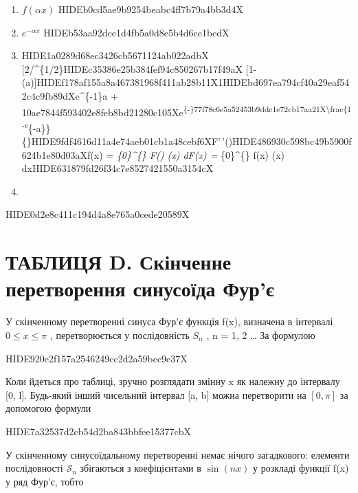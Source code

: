 \documentclass[
  ukrainian,
]{article}
\begin{document}
\begin{enumerate}
\def\labelenumi{\arabic{enumi}.}
\setcounter{enumi}{1}
\item
  \(f(\alpha x)\) HIDEb0cd5ae9b9254beabc4ff7b79a4bb3d4X
\item
  \(e^{-\alpha x}\) HIDEb53aa92dce1d4fb5a0d8c5b4d6ce1bcdX
\item
  HIDE1a0289d68ec3426cb5671124ab022adbX
  {[}2/\pi\omega{]}\^{}\{1/2\}HIDEc35386e25b384fef94c850267b17f49aX
  {[}1-\cos(\omega a){]}HIDEf178af155a8a467381968f411ab28b11X1HIDEbd697ea794cf40a29eaf542c4c9fb89dXe\^{}\{-1\}a
  +
  \omegaHIDE10ae7844f593402e8feb8bd21280c105Xe\textsuperscript{\{-\alpha\}\sin\omegaHIDE77f78c6e5a52453b9ddc1e72cb17aa21X\textbackslash frac\{1-e}\{-a\omega\}\}\{\omega\}HIDE9fdf4616d11a4e74aeb01cb1a48cebf6XF'\,'(\omega)HIDE486930c598bc49b5900f624b1e80d03aXf(x)
  = \int\emph{\{0\}\^{}\{\infty\} F(\omega) \cos(\omega x)
  d\omega \qquad \qquad F(x) =  \int}\{0\}\^{}\{\infty\}
  f(x) \cos(\omega x) dxHIDE631879fd26f34c7e8527421550a3154cX
\item
\end{enumerate}

HIDE0d2e8c411c194d4a8e765a0cede20589X

\section{ТАБЛИЦЯ D. Скінченне перетворення синусоїда
Фур'є}\label{ux442ux430ux431ux43bux438ux446ux44f-d.-ux441ux43aux456ux43dux447ux435ux43dux43dux435-ux43fux435ux440ux435ux442ux432ux43eux440ux435ux43dux43dux44f-ux441ux438ux43dux443ux441ux43eux457ux434ux430-ux444ux443ux440ux454-1}

У скінченному перетворенні синуса Фур'є функція f(x), визначена в
інтервалі \(0 \le x \le \pi\) , перетворюється у послідовність \(S_n\) ,
n = 1, 2 \ldots{} За формулою

HIDE920e2f157a2546249cc2d2a59bcc9e37X

Коли йдеться про таблиці, зручно розглядати змінну x як належну до
інтервалу {[}0, l{]}. Будь-який інший чисельний інтервал {[}a, b{]}
можна перетворити на \([0, \pi]\) за допомогою формули

HIDE7a32537d2cb54d2ba843bbfee15377cbX

У скінченному синусоїдальному перетворенні немає нічого загадкового:
елементи послідовності \(\mathcal{S}_n\) збігаються з коефіцієнтами в
\(\sin(nx)\) у розкладі функції f(x) у ряд Фур'є, тобто
\end{document}
